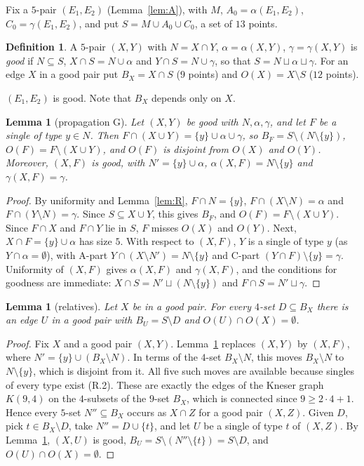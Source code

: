 \documentclass[11pt]{amsart}
\newtheorem{lemma}[theorem]{Lemma}
\theoremstyle{definition}
\newtheorem{definition}[theorem]{Definition}
\begin{document}
Fix a $5$-pair $(E_1,E_2)$ (Lemma~\ref{lem:A}), with $M$, $A_0=\alpha(E_1,E_2)$, $C_0=\gamma(E_1,E_2)$, and put $S=M\cup A_0\cup C_0$, a set of $13$ points.

\begin{definition}
A $5$-pair $(X,Y)$ with $N=X\cap Y$, $\alpha=\alpha(X,Y)$, $\gamma=\gamma(X,Y)$ is \emph{good} if $N\subseteq S$, $X\cap S=N\cup\alpha$ and $Y\cap S=N\cup\gamma$, so that $S=N\sqcup\alpha\sqcup\gamma$. For an edge $X$ in a good pair put $B_X=X\cap S$ ($9$ points) and $O(X)=X\setminus S$ ($12$ points).
\end{definition}

$(E_1,E_2)$ is good. Note that $B_X$ depends only on $X$.

\begin{lemma}[propagation G]\label{lem:G}
Let $(X,Y)$ be good with $N,\alpha,\gamma$, and let $F$ be a single of type $y\in N$. Then $F\cap(X\cup Y)=\{y\}\cup\alpha\cup\gamma$, so $B_F=S\setminus(N\setminus\{y\})$, $O(F)=F\setminus(X\cup Y)$, and $O(F)$ is disjoint from $O(X)$ and $O(Y)$. Moreover, $(X,F)$ is good, with $N'=\{y\}\cup\alpha$, $\alpha(X,F)=N\setminus\{y\}$ and $\gamma(X,F)=\gamma$.
\end{lemma}
\begin{proof}
By uniformity and Lemma~\ref{lem:R}, $F\cap N=\{y\}$, $F\cap(X\setminus N)=\alpha$ and $F\cap(Y\setminus N)=\gamma$. Since $S\subseteq X\cup Y$, this gives $B_F$, and $O(F)=F\setminus(X\cup Y)$. Since $F\cap X$ and $F\cap Y$ lie in $S$, $F$ misses $O(X)$ and $O(Y)$. Next, $X\cap F=\{y\}\cup\alpha$ has size $5$. With respect to $(X,F)$, $Y$ is a single of type $y$ (as $Y\cap\alpha=\emptyset$), with A-part $Y\cap(X\setminus N')=N\setminus\{y\}$ and C-part $(Y\cap F)\setminus\{y\}=\gamma$. Uniformity of $(X,F)$ gives $\alpha(X,F)$ and $\gamma(X,F)$, and the conditions for goodness are immediate: $X\cap S=N'\sqcup(N\setminus\{y\})$ and $F\cap S=N'\sqcup\gamma$.
\end{proof}

\begin{lemma}[relatives]\label{lem:relatives}
Let $X$ be in a good pair. For every $4$-set $D\subseteq B_X$ there is an edge $U$ in a good pair with $B_U=S\setminus D$ and $O(U)\cap O(X)=\emptyset$.
\end{lemma}
\begin{proof}
Fix $X$ and a good pair $(X,Y)$. Lemma~\ref{lem:G} replaces $(X,Y)$ by $(X,F)$, where $N'=\{y\}\cup(B_X\setminus N)$. In terms of the $4$-set $B_X\setminus N$, this moves $B_X\setminus N$ to $N\setminus\{y\}$, which is disjoint from it. All five such moves are available because singles of every type exist (R.2). These are exactly the edges of the Kneser graph $K(9,4)$ on the $4$-subsets of the $9$-set $B_X$, which is connected since $9\ge 2\cdot4+1$. Hence every $5$-set $N''\subseteq B_X$ occurs as $X\cap Z$ for a good pair $(X,Z)$. Given $D$, pick $t\in B_X\setminus D$, take $N''=D\cup\{t\}$, and let $U$ be a single of type $t$ of $(X,Z)$. By Lemma~\ref{lem:G}, $(X,U)$ is good, $B_U=S\setminus(N''\setminus\{t\})=S\setminus D$, and $O(U)\cap O(X)=\emptyset$.
\end{proof}
\end{document}
